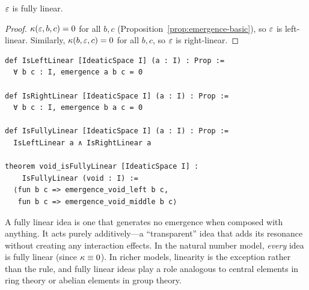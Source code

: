 \begin{proposition}
$\varepsilon$ is fully linear.
\end{proposition}
\begin{proof}
$\kappa(\varepsilon, b, c) = 0$ for all $b, c$ (Proposition~\ref{prop:emergence-basic}),
so $\varepsilon$ is left-linear. Similarly, $\kappa(b, \varepsilon, c) = 0$ for all
$b, c$, so $\varepsilon$ is right-linear.
\end{proof}

\begin{lstlisting}[language=Lean4, caption={Linearity predicates in Lean 4}]
def IsLeftLinear [IdeaticSpace I] (a : I) : Prop :=
  ∀ b c : I, emergence a b c = 0

def IsRightLinear [IdeaticSpace I] (a : I) : Prop :=
  ∀ b c : I, emergence b a c = 0

def IsFullyLinear [IdeaticSpace I] (a : I) : Prop :=
  IsLeftLinear a ∧ IsRightLinear a

theorem void_isFullyLinear [IdeaticSpace I] :
    IsFullyLinear (void : I) :=
  ⟨fun b c => emergence_void_left b c,
   fun b c => emergence_void_middle b c⟩
\end{lstlisting}

\begin{interpretation}
A fully linear idea is one that generates no emergence when composed with
anything. It acts purely additively---a ``transparent'' idea that adds its
resonance without creating any interaction effects. In the natural number
model, \emph{every} idea is fully linear (since $\kappa \equiv 0$). In
richer models, linearity is the exception rather than the rule, and
fully linear ideas play a role analogous to central elements in ring
theory or abelian elements in group theory.
\end{interpretation}


